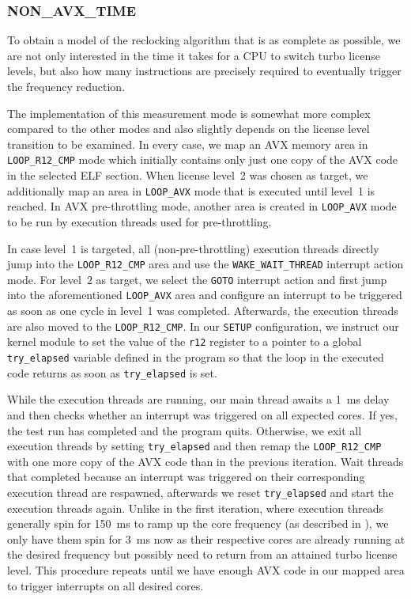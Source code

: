 \subsubsection{NON\_AVX\_TIME}
\label{sec:analysis:design:measurementmodes:nonavxtime}

To obtain a model of the reclocking algorithm that is as complete as possible, we are not only interested in the time it takes for a \gls{CPU} to switch turbo license levels, but also how many instructions are precisely required to eventually trigger the frequency reduction.

The implementation of this measurement mode is somewhat more complex compared to the other modes and also slightly depends on the license level transition to be examined. In every case, we map an \gls{AVX} memory area in \texttt{LOOP\_R12\_CMP} mode which initially contains only just one copy of the \gls{AVX} code in the selected \gls{ELF} section. When license level~2 was chosen as target, we additionally map an area in \texttt{LOOP\_AVX} mode that is executed until level~1 is reached. In \gls{AVX} pre-throttling mode, another area is created in \texttt{LOOP\_AVX} mode to be run by execution threads used for pre-throttling.

In case level~1 is targeted, all (non-pre-throttling) execution threads directly jump into the \texttt{LOOP\_R12\_CMP} area and use the \texttt{WAKE\_WAIT\_THREAD} interrupt action mode. For level~2 as target, we select the \texttt{GOTO} interrupt action and first jump into the aforementioned \texttt{LOOP\_AVX} area and configure an interrupt to be triggered as soon as one cycle in level~1 was completed. Afterwards, the execution threads are also moved to the \texttt{LOOP\_R12\_CMP}. In our \texttt{SETUP} configuration, we instruct our kernel module to set the value of the \texttt{r12} register to a pointer to a global \texttt{try\_elapsed} variable defined in the program so that the loop in the executed code returns as soon as \texttt{try\_elapsed} is set.

While the execution threads are running, our main thread awaits a \SI{1}{\milli\second} delay and then checks whether an interrupt was triggered on all expected cores. If yes, the test run has completed and the program quits. Otherwise, we exit all execution threads by setting \texttt{try\_elapsed} and then remap the \texttt{LOOP\_R12\_CMP} with one more copy of the \gls{AVX} code than in the previous iteration. Wait threads that completed because an interrupt was triggered on their corresponding execution thread are respawned, afterwards we reset \texttt{try\_elapsed} and start the execution threads again. Unlike in the first iteration, where execution threads generally spin for \SI{150}{\milli\second} to ramp up the core frequency (as described in ), we only have them spin for \SI{3}{\milli\second} now as their respective cores are already running at the desired frequency but possibly need to return from an attained turbo license level. This procedure repeats until we have enough \gls{AVX} code in our mapped area to trigger interrupts on all desired cores.

